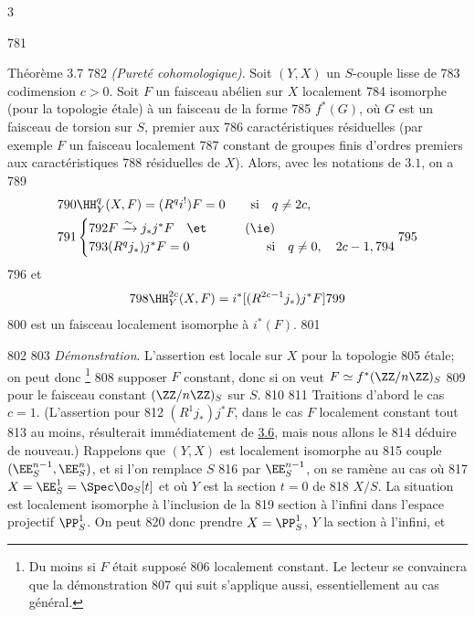 3	\documentclass[10pt]{../fichiers-configuration-latex/smfart}
\begin{document}
   781	\begin{enonce*}{Théorème 3.7}
   782	\emph{(Pureté cohomologique)}. Soit $(Y,X)$ un $S$-couple lisse de
   783	codimension $c>0$. Soit $F$ un faisceau abélien sur $X$ localement
   784	isomorphe (pour la topologie étale) à un faisceau de la forme
   785	$f^{\ast}(G)$, où $G$ est un faisceau de torsion sur $S$, premier aux
   786	caractéristiques résiduelles (par exemple $F$ un faisceau localement
   787	constant de groupes finis d'ordres premiers aux caractéristiques
   788	résiduelles de $X$). Alors, avec les notations de $3.1$, on a
   789	\begin{align*}
   790	&\HH^{q}_Y(X,F)=(R^{q}i^{!})F=0\qquad\mbox{si}\quad q\neq 2c,\\
   791	&\begin{cases}
   792	 F\xrightarrow{\sim} j_{\ast}j^{\ast}F\quad\et &\tag{\ie}\\
   793	(R^{q}j_{\ast})j^{\ast}F=0 &\hspace{1.3cm} \mbox{si}\quad q\neq 0,\quad 2c-1,
   794	\end{cases}
   795	\end{align*}
   796	et	$$
   798	\HH^{2c}_Y(X,F)=i^{\ast}[(R^{2c-1}j_{\ast})j^{\ast}F]
   799	$$
   800	est un faisceau localement isomorphe à $i^{\ast}(F)$.
   801	\end{enonce*}
   802	
   803		\emph{Démonstration}. L'assertion est locale sur $X$ pour la topologie
   805	étale; on peut donc \footnote[1]{Du moins si $F$ était supposé
   806	  localement constant. Le lecteur se convaincra que la démonstration
   807	  qui suit s'applique aussi, essentiellement au cas général.} %
   808	supposer $F$ constant, donc si on veut $F\simeq f^{\ast}(\ZZ/n\ZZ)_S$
   809	pour le faisceau constant $(\ZZ/n\ZZ)_S$ sur $S$.
   810	
   811	Traitions d'abord le cas $c=1$. (L'assertion pour
   812	$(R^{1}j_{\ast})j^{\ast}F$, dans le cas $F$ localement constant tout
   813	au moins, résulterait immédiatement de \hyperref[XVI.cor3.6]{3.6}, mais nous allons le
   814	déduire de nouveau.) Rappelons que $(Y,X)$ est localement isomorphe au
   815	couple $(\EE^{n-1}_S, \EE^n_S)$, et si l'on remplace $S$
   816	par $\EE^{n-1}_S$, on se ramène au cas où
   817	$X=\EE^{1}_S=\Spec \Oo_S[t]$ et où $Y$ est la section $t=0$ de
   818	$X/S$. La situation est localement isomorphe à l'inclusion de la
   819	section à l'infini dans l'espace projectif $\PP^{1}_S$. On peut
   820	donc prendre $X=\PP^{1}_S$, $Y$ la section à l'infini, et
\end{document}

